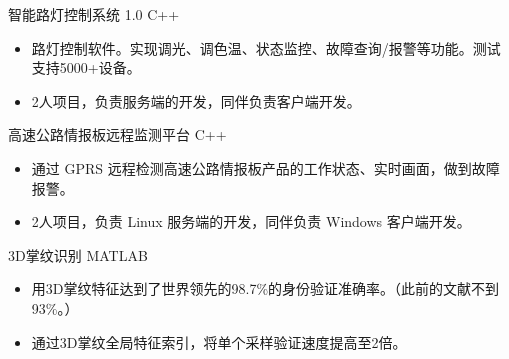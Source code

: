 \documentclass[11pt,a4paper]{moderncv/moderncv}
\begin{document}
{智能路灯控制系统 1.0}
{C++}
{}{}
{
\begin{itemize}
	\item 路灯控制软件。实现调光、调色温、状态监控、故障查询/报警等功能。测试支持5000+设备。
	\item 2人项目，负责服务端的开发，同伴负责客户端开发。
\end{itemize}
}

{高速公路情报板远程监测平台}
{C++}
{}{}
{
\begin{itemize}
	\item 通过 GPRS 远程检测高速公路情报板产品的工作状态、实时画面，做到故障报警。
	\item 2人项目，负责 Linux 服务端的开发，同伴负责 Windows 客户端开发。
\end{itemize}
}




{3D掌纹识别}
{MATLAB}
{}{}
{
\begin{itemize}
	\item 用3D掌纹特征达到了世界领先的98.7\%的身份验证准确率。（此前的文献不到93\%。）
	\item 通过3D掌纹全局特征索引，将单个采样验证速度提高至2倍。
\end{itemize}
}


\end{document}
